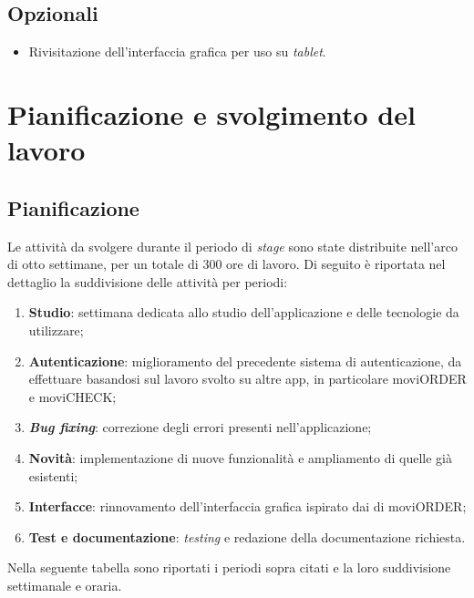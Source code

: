 \subsection{Opzionali}

\begin{itemize}
    \item Rivisitazione dell'interfaccia grafica per uso su \textit{tablet}.
\end{itemize}


\section{Pianificazione e svolgimento del lavoro}

\subsection{Pianificazione}

Le attività da svolgere durante il periodo di \textit{stage} sono state distribuite nell'arco di otto settimane, per un totale di 300 ore di lavoro. Di seguito è riportata nel dettaglio la suddivisione delle attività per periodi:
\begin{enumerate}
    \item \textbf{Studio}: settimana dedicata allo studio dell'applicazione e delle tecnologie da utilizzare;
    \item \textbf{Autenticazione}: miglioramento del precedente sistema di autenticazione, da effettuare basandosi sul lavoro svolto su altre app, in particolare moviORDER e moviCHECK;
    \item \textbf{\textit{Bug fixing}}: correzione degli errori presenti nell'applicazione;
    \item \textbf{Novità}: implementazione di nuove funzionalità e ampliamento di quelle già esistenti;
    \item \textbf{Interfacce}: rinnovamento dell'interfaccia grafica ispirato dai \textit{} di moviORDER;
    \item \textbf{Test e documentazione}: \textit{testing} e redazione della documentazione richiesta.
\end{enumerate}
Nella seguente tabella sono riportati i periodi sopra citati e la loro suddivisione settimanale e oraria.

